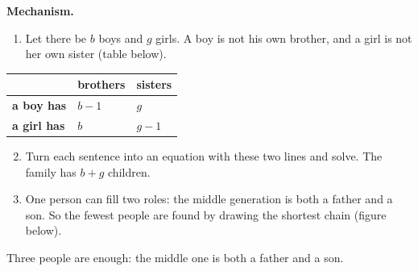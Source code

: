 \documentclass[11pt,a4paper]{article}
\newcommand{\mech}{\textbf{\color{ember}Mechanism.}\ }
\begin{document}
\mech
\begin{enumerate}
\item Let there be $b$ boys and $g$ girls. A boy is not his own brother, and a girl is not her own sister (table below).
\end{enumerate}
\begin{center}\small\renewcommand{\arraystretch}{1.18}\setlength{\tabcolsep}{12pt}
\begin{tabular}{@{}lll@{}}
\toprule
 & \textbf{\color{slate}brothers} & \textbf{\color{slate}sisters} \\ \midrule
\textbf{\color{slate}a boy has} & $b - 1$ & $g$ \\
\textbf{\color{slate}a girl has} & $b$ & $g - 1$ \\
\bottomrule
\end{tabular}\end{center}
\begin{enumerate}
\setcounter{enumi}{1}
\item Turn each sentence into an equation with these two lines and solve. The family has $b + g$ children.
\item One person can fill two roles: the middle generation is both a father and a son. So the fewest people are found by drawing the shortest chain (figure below).
\end{enumerate}

\begin{center}
\par\nopagebreak\smallskip
{\small Three people are enough: the middle one is both a father and a son.}
\end{center}
\end{document}
